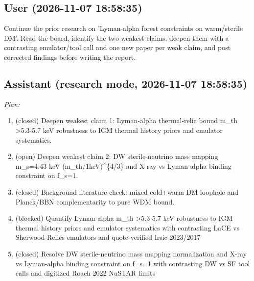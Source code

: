 \documentclass[11pt,a4paper]{article}
\begin{document}
\subsection*{User \small(2026-11-07 18:58:35)}
Continue the prior research on 'Lyman-alpha forest constraints on warm/sterile DM'. Read the board, identify the two weakest claims, deepen them with a contrasting emulator/tool call and one new paper per weak claim, and post corrected findings before writing the report.

\subsection*{Assistant \small(research mode, 2026-11-07 18:58:35)}
\textit{Plan:}\begin{enumerate}
  \item (closed) Deepen weakest claim 1: Lyman-alpha thermal-relic bound m\_th \textgreater{}5.3-5.7 keV robustness to IGM thermal history priors and emulator systematics.
  \item (open) Deepen weakest claim 2: DW sterile-neutrino mass mapping m\_s=4.43 keV (m\_th/1keV)\textasciicircum{}\{4/3\} and X-ray vs Lyman-alpha binding constraint on f\_s=1.
  \item (closed) Background literature check: mixed cold+warm DM loophole and Planck/BBN complementarity to pure WDM bound.
  \item (blocked) Quantify Lyman-alpha m\_th \textgreater{}5.3-5.7 keV robustness to IGM thermal history priors and emulator systematics with contrasting LaCE vs Sherwood-Relics emulators and quote-verified Irsic 2023/2017
  \item (closed) Resolve DW sterile-neutrino mass mapping normalization and X-ray vs Lyman-alpha binding constraint on f\_s=1 with contrasting DW vs SF tool calls and digitized Roach 2022 NuSTAR limits
\end{enumerate}
\end{document}
